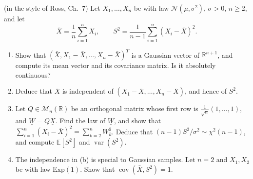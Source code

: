 \begin{exercise}\label{ex:gv-sample-mean}
\hard (in the style of Ross, Ch.~7) Let $X_1,\dots,X_n$ be \iid with law $\mathcal N(\mu,\sigma^2)$,
$\sigma>0$, $n\ge2$, and let
\[
  \bar X=\frac1n\sum_{i=1}^nX_i,\qquad S^2=\frac1{n-1}\sum_{i=1}^n(X_i-\bar X)^2 .
\]
\begin{enumerate}[label=(\alph*)]
  \item Show that $(\bar X,X_1-\bar X,\dots,X_n-\bar X)^T$ is a Gaussian vector of
    $\mathbb R^{n+1}$, and compute its mean vector and its covariance matrix. Is it absolutely
    continuous?
  \item Deduce that $\bar X$ is independent of $(X_1-\bar X,\dots,X_n-\bar X)$, and hence of $S^2$.
  \item Let $Q\in\mathcal M_n(\mathbb R)$ be an orthogonal matrix whose first row is
    $\frac1{\sqrt n}(1,\dots,1)$, and $\underline W=Q\underline X$. Find the law of $\underline W$, and
    show that $\sum_{i=1}^n(X_i-\bar X)^2=\sum_{k=2}^nW_k^2$. Deduce that
    $(n-1)S^2/\sigma^2\sim\chi^2(n-1)$, and compute $\mathbb E[S^2]$ and $\operatorname{var}(S^2)$.
  \item The independence in (b) is special to Gaussian samples. Let $n=2$ and $X_1,X_2$ be \iid
    with law $\mathrm{Exp}(1)$. Show that $\operatorname{cov}(\bar X,S^2)=1$.
\end{enumerate}
\end{exercise}

